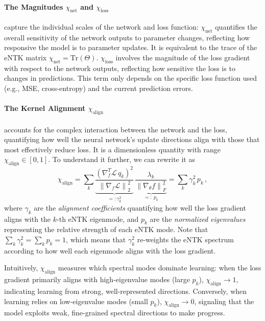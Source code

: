 \paragraph{The Magnitudes $\chi_{\text{net}}$ and $\chi_{\text{loss}}$} capture the individual scales of the network and loss function:
$\chi_{\text{net}}$ quantifies the overall sensitivity of the network outputs to parameter changes, reflecting how responsive the model is to parameter updates. It is equivalent to the trace of the eNTK matrix $\chi_{\text{net}} = \text{Tr}(\Theta)$.
$\chi_{\text{loss}}$ involves the magnitude of the loss gradient with respect to the network outputs, reflecting how sensitive the loss is to changes in predictions. This term only depends on the specific loss function used (e.g., MSE, cross-entropy) and the current prediction errors.
\paragraph{The Kernel Alignment $\chi_{\text{align}}$} accounts for the complex interaction between the network and the loss, quantifying how well the neural network's update directions align with those that most effectively reduce loss. It is a dimensionless quantity with range \(\chi_{\text{align}} \in [0, 1]\).
To understand it further, we can rewrite it as
\begin{equation}
    \chi_{\text{align}} = \sum_{k} \underbrace{\frac{ (\nabla_f^T \mathcal{L} \, q_k)^2 }{\left\| \nabla_f \mathcal{L} \right\|_2^2}}_{=:\gamma_k^2} \,
    \underbrace{\frac{\lambda_k}{\left\| \nabla_\theta f \right\|_F^2}}_{=:\ p_k}
    = \sum_{k} \gamma_k^2 \, p_k \, ,
\end{equation}
where \( \gamma_k \) are the \emph{alignment coefficients} quantifying how well the loss gradient aligns with the \(k\)-th eNTK eigenmode, and \( p_k \) are the \emph{normalized eigenvalues} representing the relative strength of each eNTK mode.
Note that \(\sum_k \gamma_k^2 = \sum_k p_k = 1 \), which means that \( \gamma_k^2 \) re-weights the eNTK spectrum according to how well each eigenmode aligns with the loss gradient.

Intuitively, $\chi_{\text{align}}$ measures which spectral modes dominate learning: when the loss gradient primarily aligns with high-eigenvalue modes (large \(p_k\)), $\chi_{\text{align}} \to 1$, indicating learning from strong, well-represented directions. Conversely, when learning relies on low-eigenvalue modes (small \(p_k\)), $\chi_{\text{align}} \to 0$, signaling that the model exploits weak, fine-grained spectral directions to make progress.

